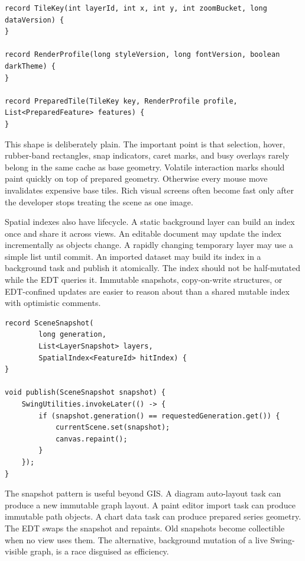 \begin{lstlisting}[caption={Separating base tile data from volatile overlays.}]
record TileKey(int layerId, int x, int y, int zoomBucket, long dataVersion) {
}

record RenderProfile(long styleVersion, long fontVersion, boolean darkTheme) {
}

record PreparedTile(TileKey key, RenderProfile profile, List<PreparedFeature> features) {
}
\end{lstlisting}

This shape is deliberately plain. The important point is that selection, hover, rubber-band rectangles, snap indicators, caret marks, and busy overlays rarely belong in the same cache as base geometry. Volatile interaction marks should paint quickly on top of prepared geometry. Otherwise every mouse move invalidates expensive base tiles. Rich visual screens often become fast only after the developer stops treating the scene as one image.

Spatial indexes also have lifecycle. A static background layer can build an index once and share it across views. An editable document may update the index incrementally as objects change. A rapidly changing temporary layer may use a simple list until commit. An imported dataset may build its index in a background task and publish it atomically. The index should not be half-mutated while the EDT queries it. Immutable snapshots, copy-on-write structures, or EDT-confined updates are easier to reason about than a shared mutable index with optimistic comments.

\begin{lstlisting}[caption={Publishing immutable geometry snapshots to the EDT.}]
record SceneSnapshot(
        long generation,
        List<LayerSnapshot> layers,
        SpatialIndex<FeatureId> hitIndex) {
}

void publish(SceneSnapshot snapshot) {
    SwingUtilities.invokeLater(() -> {
        if (snapshot.generation() == requestedGeneration.get()) {
            currentScene.set(snapshot);
            canvas.repaint();
        }
    });
}
\end{lstlisting}

The snapshot pattern is useful beyond GIS. A diagram auto-layout task can produce a new immutable graph layout. A paint editor import task can produce immutable path objects. A chart data task can produce prepared series geometry. The EDT swaps the snapshot and repaints. Old snapshots become collectible when no view uses them. The alternative, background mutation of a live Swing-visible graph, is a race disguised as efficiency.

